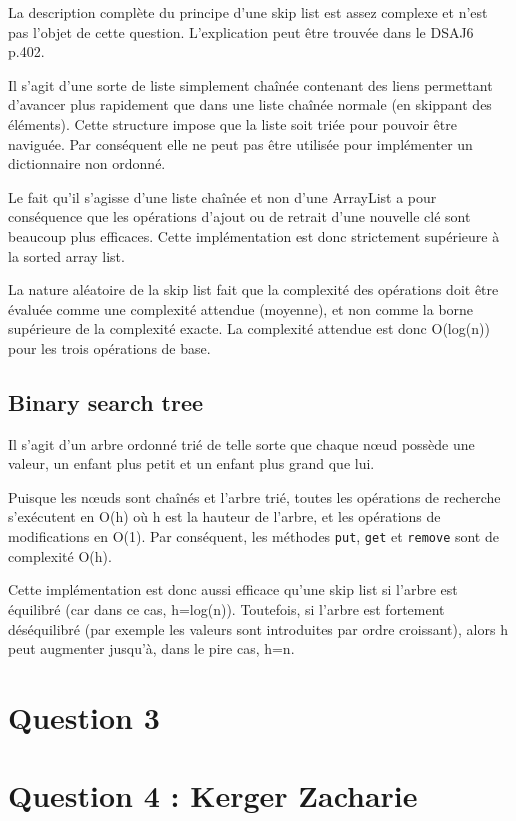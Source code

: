 \documentclass[10pt,a4paper]{article}
\begin{document}
	La description complète du principe d'une skip list est assez complexe et n'est pas l'objet de cette question. L'explication peut être trouvée dans le DSAJ6 p.402.
	
	Il s'agit d'une sorte de liste simplement chaînée contenant des liens permettant d'avancer plus rapidement que dans une liste chaînée normale (en skippant des éléments).
	Cette structure impose que la liste soit triée pour pouvoir être naviguée. Par conséquent elle ne peut pas être utilisée pour implémenter un dictionnaire non ordonné.
	
	Le fait qu'il s'agisse d'une liste chaînée et non d'une ArrayList a pour conséquence que les opérations d'ajout ou de retrait d'une nouvelle clé sont beaucoup plus efficaces. Cette implémentation est donc strictement supérieure à la sorted array list.
	
	La nature aléatoire de la skip list fait que la complexité des opérations doit être évaluée comme une complexité attendue (moyenne), et non comme la borne supérieure de la complexité exacte.
	La complexité attendue est donc O(log(n)) pour les trois opérations de base.
	
	\subsection*{Binary search tree}
	
	Il s'agit d'un arbre ordonné trié de telle sorte que chaque nœud possède une valeur, un enfant plus petit et un enfant plus grand que lui.
	
	Puisque les nœuds sont chaînés et l'arbre trié, toutes les opérations de recherche s'exécutent en O(h) où h est la hauteur de l'arbre, et les opérations de modifications en O(1). Par conséquent, les méthodes \texttt{put}, \texttt{get} et \texttt{remove} sont de complexité O(h).
	
	Cette implémentation est donc aussi efficace qu'une skip list si l'arbre est équilibré (car dans ce cas, h=log(n)). Toutefois, si l'arbre est fortement déséquilibré (par exemple les valeurs sont introduites par ordre croissant), alors h peut augmenter jusqu'à, dans le pire cas, h=n.
	

\section*{Question 3}
\section*{Question 4 : Kerger Zacharie}
\end{document}
